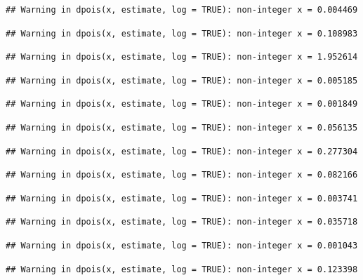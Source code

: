 \documentclass[]{article}
\begin{document}
\begin{verbatim}
## Warning in dpois(x, estimate, log = TRUE): non-integer x = 0.004469
\end{verbatim}

\begin{verbatim}
## Warning in dpois(x, estimate, log = TRUE): non-integer x = 0.108983
\end{verbatim}

\begin{verbatim}
## Warning in dpois(x, estimate, log = TRUE): non-integer x = 1.952614
\end{verbatim}

\begin{verbatim}
## Warning in dpois(x, estimate, log = TRUE): non-integer x = 0.005185
\end{verbatim}

\begin{verbatim}
## Warning in dpois(x, estimate, log = TRUE): non-integer x = 0.001849
\end{verbatim}

\begin{verbatim}
## Warning in dpois(x, estimate, log = TRUE): non-integer x = 0.056135
\end{verbatim}

\begin{verbatim}
## Warning in dpois(x, estimate, log = TRUE): non-integer x = 0.277304
\end{verbatim}

\begin{verbatim}
## Warning in dpois(x, estimate, log = TRUE): non-integer x = 0.082166
\end{verbatim}

\begin{verbatim}
## Warning in dpois(x, estimate, log = TRUE): non-integer x = 0.003741
\end{verbatim}

\begin{verbatim}
## Warning in dpois(x, estimate, log = TRUE): non-integer x = 0.035718
\end{verbatim}

\begin{verbatim}
## Warning in dpois(x, estimate, log = TRUE): non-integer x = 0.001043
\end{verbatim}

\begin{verbatim}
## Warning in dpois(x, estimate, log = TRUE): non-integer x = 0.123398
\end{verbatim}
\end{document}

